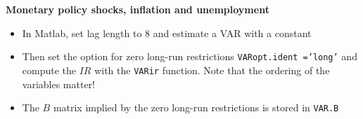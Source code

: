 \documentclass[10pt,english,t,aspectratio=169,ignorenonframetext]{beamer}
\begin{document}
\begin{frame}
{\textbf{Monetary policy shocks, inflation and unemployment}}\vspace{-.1cm}

\begin{itemize}
\item In Matlab, set lag length to $8$ and estimate a VAR with a constant
\medskip

\begin{minipage}[b]{.9\textwidth}
\end{minipage}

\medskip

\item Then set the option for zero long-run restrictions %
\colorbox{script!80}{\small\texttt{VARopt.ident ='long'}} and compute the $%
IR $ with the \colorbox{script!80}{\small\texttt{VARir}} function. Note that
the ordering of the variables matter!\medskip

\begin{minipage}[b]{.9\textwidth}
\end{minipage}

\medskip

\item The $B$ matrix implied by the zero long-run restrictions is stored in %
\colorbox{script!80}{\small\texttt{VAR.B}}
\end{itemize}
\end{frame}
\end{document}

